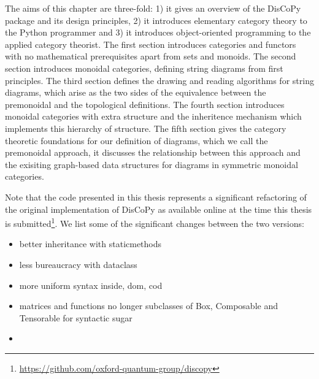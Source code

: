 The aims of this chapter are three-fold: 1) it gives an overview of the DisCoPy package and its design principles, 2) it introduces elementary category theory to the Python programmer and 3) it introduces object-oriented programming to the applied category theorist.
The first section introduces categories and functors with no mathematical prerequisites apart from sets and monoids.
The second section introduces monoidal categories, defining string diagrams from first principles.
The third section defines the drawing and reading algorithms for string diagrams, which arise as the two sides of the equivalence between the premonoidal and the topological definitions.
The fourth section introduces monoidal categories with extra structure and the inheritence mechanism which implements this hierarchy of structure.
The fifth section gives the category theoretic foundations for our definition of diagrams, which we call the premonoidal approach, it discusses the relationship between this approach and the exisiting graph-based data structures for diagrams in symmetric monoidal categories.

Note that the code presented in this thesis represents a significant refactoring of the original implementation of DisCoPy as available online at the time this thesis is submitted\footnote
{\url{https://github.com/oxford-quantum-group/discopy}}.
We list some of the significant changes between the two versions:
\begin{itemize}
\item better inheritance with staticmethods
\item less bureaucracy with dataclass
\item more uniform syntax inside, dom, cod
\item matrices and functions no longer subclasses of Box, Composable and Tensorable for syntactic sugar
\item 
\end{itemize}
